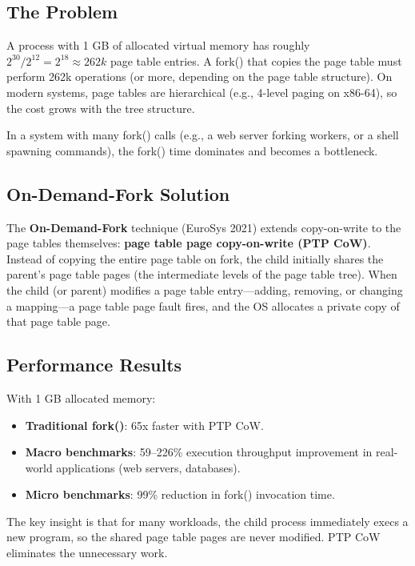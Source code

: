 \documentclass[11pt]{article}
\begin{document}
\subsection{The Problem}

A process with 1 GB of allocated virtual memory has roughly $2^{30} / 2^{12} = 2^{18} \approx 262k$ page table entries. A fork() that copies the page table must perform 262k operations (or more, depending on the page table structure). On modern systems, page tables are hierarchical (e.g., 4-level paging on x86-64), so the cost grows with the tree structure.

In a system with many fork() calls (e.g., a web server forking workers, or a shell spawning commands), the fork() time dominates and becomes a bottleneck.

\subsection{On-Demand-Fork Solution}

The \textbf{On-Demand-Fork} technique (EuroSys 2021) extends copy-on-write to the page tables themselves: \textbf{page table page copy-on-write (PTP CoW)}. Instead of copying the entire page table on fork, the child initially shares the parent's page table pages (the intermediate levels of the page table tree). When the child (or parent) modifies a page table entry---adding, removing, or changing a mapping---a page table page fault fires, and the OS allocates a private copy of that page table page.

\subsection{Performance Results}

With 1 GB allocated memory:

\begin{itemize}
    \item \textbf{Traditional fork()}: 65x faster with PTP CoW.
    \item \textbf{Macro benchmarks}: 59--226\% execution throughput improvement in real-world applications (web servers, databases).
    \item \textbf{Micro benchmarks}: 99\% reduction in fork() invocation time.
\end{itemize}

The key insight is that for many workloads, the child process immediately execs a new program, so the shared page table pages are never modified. PTP CoW eliminates the unnecessary work.
\end{document}
